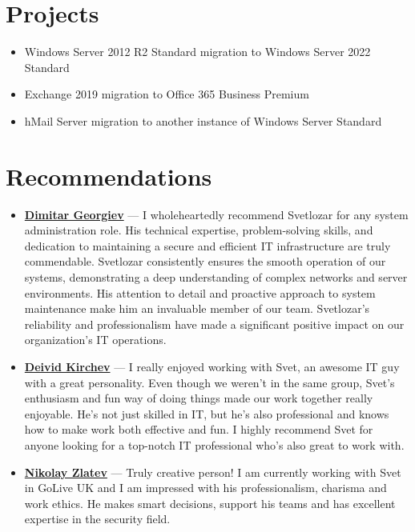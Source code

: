 \documentclass[letterpaper,10pt]{article}
\begin{document}
\begin{minipage}[t]{0.5\textwidth}
		\section*{Projects}
		\begin{itemize}
			\item Windows Server 2012 R2 Standard migration to Windows Server 2022 Standard
			\item Exchange 2019 migration to Office 365 Business Premium
			\item hMail Server migration to another instance of Windows Server Standard
		\end{itemize}
		
		\section*{Recommendations}
			\begin{itemize}
				\fontsize{8}{9}\selectfont
		\item \textbf{\href{https://www.linkedin.com/in/dimitar-georgiev-29a6ab144/}{Dimitar Georgiev}} — I wholeheartedly recommend Svetlozar for any system administration role. His technical expertise, problem-solving skills, and dedication to maintaining a secure and efficient IT infrastructure are truly commendable. Svetlozar consistently ensures the smooth operation of our systems, demonstrating a deep understanding of complex networks and server environments. His attention to detail and proactive approach to system maintenance make him an invaluable member of our team. Svetlozar's reliability and professionalism have made a significant positive impact on our organization's IT operations.
			\item \textbf{\href{https://www.linkedin.com/in/deivid-kirchev-00378b252/}{Deivid Kirchev}} — I  really enjoyed working with Svet, an awesome IT guy with a great personality. Even though we weren't in the same group, Svet's enthusiasm and fun way of doing things made our work together really enjoyable. He's not just skilled in IT, but he's also professional and knows how to make work both effective and fun. I highly recommend Svet for anyone looking for a top-notch IT professional who's also great to work with.
			\item \textbf{\href{https://www.linkedin.com/in/nikolay-zlatev/}{Nikolay Zlatev}} — Truly creative person! I am currently working with Svet in GoLive UK and I am impressed with his professionalism, charisma and work ethics. He makes smart decisions, support his teams and has excellent expertise in the security field.
		\end{itemize}
	\end{minipage}
	
\end{document}
